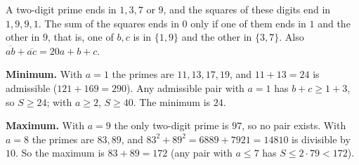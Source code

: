A two-digit prime ends in $1,3,7$ or $9$, and the squares of these digits end in $1,9,9,1$. The sum of the squares ends in $0$ only if one of them ends in $1$ and the other in $9$, that is, one of $b,c$ is in $\{1,9\}$ and the other in $\{3,7\}$. Also $\overline{ab}+\overline{ac}=20a+b+c$.

\textbf{Minimum.} With $a=1$ the primes are $11,13,17,19$, and $11+13=24$ is admissible ($121+169=290$). Any admissible pair with $a=1$ has $b+c\ge1+3$, so $S\ge24$; with $a\ge2$, $S\ge40$. The minimum is $\boxed{24}$.

\textbf{Maximum.} With $a=9$ the only two-digit prime is $97$, so no pair exists. With $a=8$ the primes are $83,89$, and $83^2+89^2=6889+7921=14810$ is divisible by $10$. So the maximum is $83+89=\boxed{172}$ (any pair with $a\le7$ has $S\le2\cdot79<172$).
